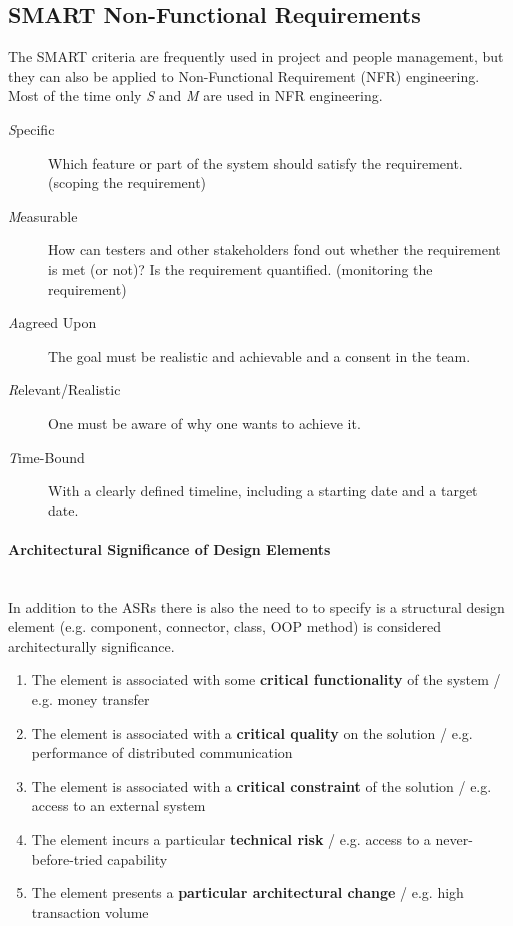 \subsection{SMART Non-Functional Requirements}
The SMART criteria are frequently used in project and people management, but they can also be applied to Non-Functional Requirement (NFR) engineering. Most of the time only \textit{S} and \textit{M} are used in NFR engineering.

\begin{description}
	\item [\textit{S}pecific] Which feature or part of the system should satisfy the requirement. (scoping the requirement)
	\item [\textit{M}easurable] How can testers and other stakeholders fond out whether the requirement is met (or not)? Is the requirement quantified. (monitoring the requirement)
	\item [\textit{A}agreed Upon] The goal must be realistic and achievable and a consent in the team.
	\item [\textit{R}elevant/Realistic] One must be aware of why one wants to achieve it.
	\item [\textit{T}ime-Bound] With a clearly defined timeline, including a starting date and a target date.
\end{description}

\paragraph{Architectural Significance of Design Elements} \hfill \\
In addition to the ASRs there is also the need to to specify is a structural design element (e.g. component, connector, class, OOP method) is considered architecturally significance.

\begin{enumerate}
	\item The element is associated with some \textbf{critical functionality} of the system / e.g. money transfer
	\item The element is associated with a \textbf{critical quality} on the solution / e.g. performance of distributed communication
	\item The element is associated with a \textbf{critical constraint} of the solution / e.g. access to an external system
	\item The element incurs a particular  \textbf{technical risk} / e.g. access to a never-before-tried capability
	\item The element presents a \textbf{particular architectural change} / e.g. high transaction volume
\end{enumerate}

